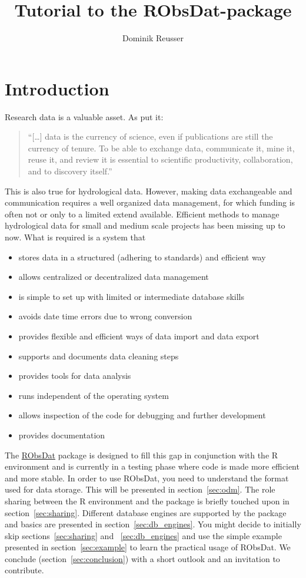 \documentclass[a4paper]{article}
\begin{document}
\title{Tutorial to the RObsDat-package}
\author{Dominik Reusser}
\maketitle
\section{Introduction}
Research data is a valuable asset. As \citet{Gold2007} put it:
\begin{quotation}
   ``[\ldots] data is the currency of science, even if publications are still the currency of tenure. To be able to exchange data, communicate it, mine it, reuse it, and review it is essential to scientific productivity, collaboration, and to discovery itself.''
\end{quotation}

This is also true for hydrological data. However, making data exchangeable and communication requires a well organized data management, for which funding is often not or only to a limited extend available. Efficient methods to manage hydrological data for small and medium scale projects has been missing up to now. What is required is a system that
\begin{itemize}
  \item stores data in a structured (adhering to standards) and efficient way
  \item allows centralized or decentralized data management
  \item is simple to set up with limited or intermediate database skills
  \item avoids date time errors due to wrong conversion
  \item provides flexible and efficient ways of data import and data export
  \item supports and documents data cleaning steps
  \item provides tools for data analysis
  \item runs independent of the operating system
  \item allows inspection of the code for debugging and further development
  \item provides documentation
\end{itemize}

The \href{http://cran.r-project.org/web/packages/RObsDat/index.html}{RObsDat} package is designed to fill this gap
in conjunction with the R environment and is currently in a
testing phase where code is made more efficient and more
stable. In order to use RObsDat, you need to understand the
format used for data storage. This will be presented in
section~\ref{sec:odm}. The role sharing between the R
environment and the package is briefly touched upon in
section~\ref{sec:sharing}. Different database
engines are supported by the package and basics
are presented in section~\ref{sec:db_engines}.
You might decide to initially skip
sections~\ref{sec:sharing} and
~\ref{sec:db_engines} and use the simple example
presented in section~\ref{sec:example} to learn
the practical usage of RObsDat. We conclude
(section~\ref{sec:conclusion}) with a
short outlook and an invitation to contribute.
\end{document}
